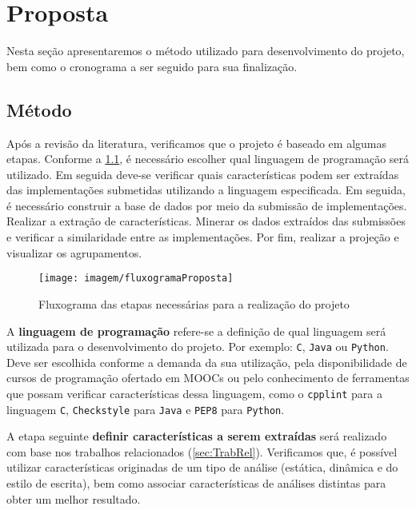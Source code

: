 \chapter{Proposta}
\label{chap:Proposta}

	Nesta seção apresentaremos o método utilizado para desenvolvimento do projeto, bem
	como o cronograma a ser seguido para sua finalização.

	\section{Método}
	Após a revisão da literatura, verificamos que o projeto é baseado em algumas etapas.
	Conforme a \cref{fig:fluxogramaProposta}, é necessário escolher qual linguagem de programação
	será utilizado. Em seguida deve-se verificar quais características podem ser extraídas
	das implementações submetidas utilizando a linguagem especificada. Em seguida, é
	necessário construir a base de dados por meio da submissão de implementações. Realizar
	a extração de características. Minerar os dados extraídos das submissões e verificar a
	similaridade entre as implementações. Por fim, realizar a projeção e visualizar os
	agrupamentos.

	\begin{figure}[h]
		\centering
		\texttt{[image: imagem/fluxogramaProposta]}
		\captionsetup{justification=centering}
		\caption{Fluxograma das etapas necessárias para a realização do projeto}
		\label{fig:fluxogramaProposta}
	\end{figure}

	A \textbf{linguagem de programação} refere-se a definição de qual linguagem será
	utilizada para o desenvolvimento do projeto. Por exemplo: \texttt{C}, \texttt{Java}
	ou \texttt{Python}. Deve ser escolhida conforme a demanda da sua utilização, pela
	disponibilidade de cursos de programação ofertado em MOOCs ou pelo conhecimento de
	ferramentas que possam verificar características dessa linguagem, como o
	\texttt{cpplint} para a linguagem \texttt{C}, \texttt{Checkstyle} para
	\texttt{Java} e \texttt{PEP8} para \texttt{Python}.

	A etapa seguinte \textbf{definir características a serem extraídas} será realizado
	com base nos trabalhos relacionados (\cref{sec:TrabRel}). Verificamos que, é
	possível utilizar características originadas de um tipo de análise (estática,
	dinâmica e do estilo de escrita), bem como associar características de análises
	distintas para obter um melhor resultado.
	
